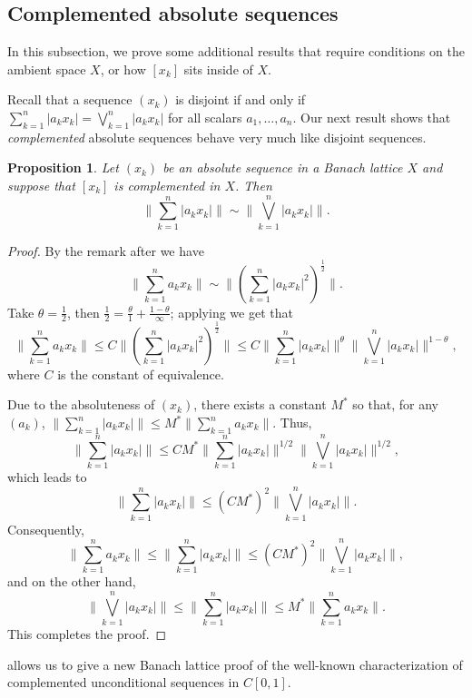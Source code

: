 \documentclass[12pt,leqno]{amsart}
\newtheorem{proposition}[theorem]{Proposition}
\numberwithin{equation}{section}
\theoremstyle{definition}
\begin{document}
\subsection{Complemented absolute sequences}\label{complemented}
In this subsection, we prove some additional results that require conditions on the ambient space $X$, or how $[x_k]$ sits inside of $X$.
\medskip

Recall that a sequence $(x_k)$ is disjoint if and only if $\sum_{k=1}^n|a_kx_k|=\bigvee_{k=1}^n|a_kx_k|$ for all scalars $a_1,\dots,a_n$. Our next result shows that  \emph{complemented} absolute sequences behave very much like disjoint sequences.
\begin{proposition}\label{???}
Let $(x_k)$ be an absolute sequence in a Banach lattice $X$ and suppose that $[x_k]$ is complemented in $X$. Then $$\bigg\|\sum_{k=1}^n |a_kx_k|\bigg\|\sim \bigg\|\bigvee_{k=1}^n |a_kx_k|\bigg\|.$$
\end{proposition}
\begin{proof}
By the remark after \cite[Theorem 1.d.6]{LT2} we have 
$$\bigg\|\sum_{k=1}^n a_kx_k\bigg\|\sim \bigg\|\left(\sum_{k=1}^n |a_kx_k|^2\right)^{\frac{1}{2}}\bigg\|.$$
Take $\theta = \frac12$, then $\frac{1}{2}=\frac{\theta}{1}+\frac{1-\theta}{\infty}$; applying \cite[Proposition 1.d.2 (i) and (ii)]{LT2} we get that 
$$\bigg\|\sum_{k=1}^n a_kx_k\bigg\|\leq C \bigg\|\left(\sum_{k=1}^n |a_kx_k|^2\right)^{\frac{1}{2}}\bigg\| \leq C \bigg\|\sum_{k=1}^n |a_kx_k|\bigg\|^\theta \bigg\| \bigvee_{k=1}^n|a_kx_k|\bigg\|^{1-\theta},$$
where $C$ is the constant of equivalence. 
\medskip

Due to the absoluteness of $(x_k)$, there exists a constant $M^*$ so that, for any $(a_k)$, $\| \sum_{k=1}^n |a_k x_k| \| \leq M^* \| \sum_{k=1}^n a_k x_k \|$. Thus,
$$
\bigg\|\sum_{k=1}^n |a_kx_k| \bigg\|\leq  C M^* \bigg\|\sum_{k=1}^n |a_kx_k|\bigg\|^{1/2} \bigg\| \bigvee_{k=1}^n|a_kx_k|\bigg\|^{1/2} ,
$$
which leads to 
$$
\bigg\|\sum_{k=1}^n |a_kx_k| \bigg\|\leq  (C M^*)^2 \bigg\| \bigvee_{k=1}^n|a_kx_k|\bigg\| .
$$
Consequently,
$$
\bigg\|\sum_{k=1}^n a_kx_k\bigg\|\leq \bigg\|\sum_{k=1}^n |a_kx_k| \bigg\| \leq (C M^*)^2 \bigg\| \bigvee_{k=1}^n|a_kx_k|\bigg\| ,
$$
and on the other hand,
$$
\bigg\| \bigvee_{k=1}^n|a_kx_k|\bigg\| \leq \bigg\|\sum_{k=1}^n |a_kx_k| \bigg\| \leq M^* \bigg\|\sum_{k=1}^n a_kx_k\bigg\| .
$$
This completes the proof.
\end{proof}
 allows us to give a new Banach lattice proof of the well-known characterization of complemented unconditional sequences in $C[0,1]$.
\end{document}
